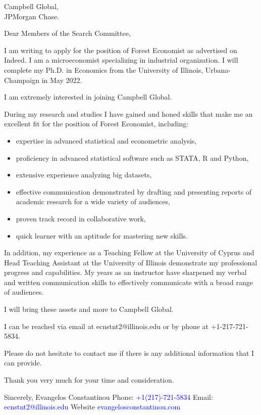 \documentclass[12pt]{letter}
\begin{document}
\date{}
\begin{letter}{Campbell Global, \\
               JPMorgan Chase.}

\opening{Dear Members of the Search Committee,}

I am writing to apply for the position of Forest Economist as advertised on Indeed.
I am a microeconomist specializing in industrial organization.
I will complete my Ph.D. in Economics from the University of Illinois, Urbana-Champaign in May 2022. 

I am extremely interested in joining Campbell Global.

During my research and studies I have gained and honed skills that make me an excellent fit for the position of Forest Economist, including:

\begin{itemize}
    \item expertise in advanced statistical and econometric analysis,
    \item proficiency in advanced statistical software such as STATA, R and Python,
    \item extensive experience analyzing big datasets,
    \item effective communication demonstrated by drafting and presenting reports of academic research for a wide variety of audiences,
    \item proven track record in collaborative work,
    \item quick learner with an aptitude for mastering new skills.
\end{itemize}

In addition, my experience as a Teaching Fellow at the University of Cyprus and Head Teaching Assistant at the University of Illinois demonstrate my professional progress and capabilities.
My years as an instructor have sharpened my verbal and written communication skills to effectively communicate with a broad range of audiences.

I will bring these assets and more to Campbell Global.

I can be reached via email at ecnstnt2@illinois.edu or by phone at +1-217-721-5834.

Please do not hesitate to contact me if there is any additional information that I can provide.

Thank you very much for your time and consideration.


\noindent Sincerely,
\newline\noindent Evangelos Constantinou
\vspace{4mm}
\newline\noindent Phone: \textcolor{blue}{+1(217)-721-5834}
\newline\noindent Email: \textcolor{blue}{ecnstnt2@illinois.edu}
\newline\noindent Website \textcolor{blue}{evangelosconstantinou.com}
\end{letter}
\end{document}

